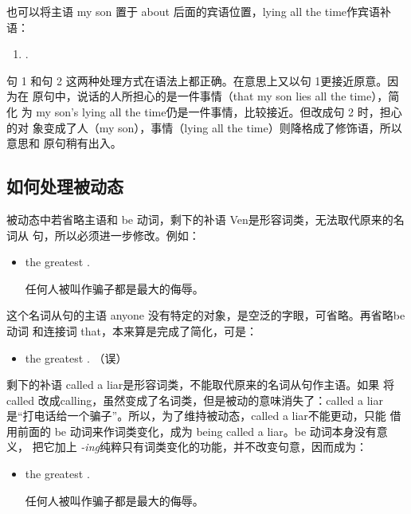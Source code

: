 也可以将主语 my son 置于 about 后面的宾语位置，lying all the time作宾语补语：
\begin{enumerate}[resume]
\item {}     .
\end{enumerate}

句 1 和句 2 这两种处理方式在语法上都正确。在意思上又以句 1更接近原意。因为在
原句中，说话的人所担心的是一件事情（that my son lies all the time），简化
为 my son's lying all the time仍是一件事情，比较接近。但改成句 2 时，担心的对
象变成了人（my son），事情（lying all the time）则降格成了修饰语，所以意思和
原句稍有出入。

\subsection{如何处理被动态}

被动态中若省略主语和 be 动词，剩下的补语 Ven是形容词类，无法取代原来的名词从
句，所以必须进一步修改。例如：
\begin{itemize}
\item {}  the greatest .

  任何人被叫作骗子都是最大的侮辱。
\end{itemize}
这个名词从句的主语 anyone 没有特定的对象，是空泛的字眼，可省略。再省略be 动词
和连接词 that，本来算是完成了简化，可是：
\begin{itemize}
\item {}  the greatest . （误）
\end{itemize}

剩下的补语 called a liar是形容词类，不能取代原来的名词从句作主语。如果
将 called 改成calling，虽然变成了名词类，但是被动的意味消失了：called a
liar是“打电话给一个骗子”。所以，为了维持被动态，called a liar不能更动，只能
借用前面的 be 动词来作词类变化，成为 being called a liar。be 动词本身没有意义，
把它加上 \emph{-ing}纯粹只有词类变化的功能，并不改变句意，因而成为：
\begin{itemize}
\item {}  the greatest
  .

  任何人被叫作骗子都是最大的侮辱。
\end{itemize}

